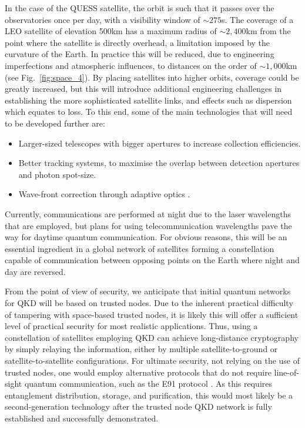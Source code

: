 In the case of the QUESS satellite, the orbit is such that it passes over the observatories once per day, with a visibility window of $\sim 275$s. The coverage of a LEO satellite of elevation 500km has a maximum radius of $\sim 2,400$km from the point where the satellite is directly overhead, a limitation imposed by the curvature of the Earth. In practice this will be reduced, due to engineering imperfections and atmospheric influences, to distances on the order of $\sim 1,000$km (see Fig.~\ref{fig:space_4}). By placing satellites into higher orbits, coverage could be greatly increased, but this will introduce additional engineering challenges in establishing the more sophisticated satellite links, and effects such as dispersion which equates to loss. To this end, some of the main technologies that will need to be developed further are:
\begin{itemize}
\item Larger-sized telescopes with bigger apertures to increase collection efficiencies.
\item Better tracking systems, to maximise the overlap between detection apertures and photon spot-size.
\item Wave-front correction through adaptive optics \cite{bib:liao2017satellite}.
\end{itemize}

Currently, communications are performed at night due to the laser wavelengths that are employed, but plans for using telecommunication wavelengths pave the way for daytime quantum communication. For obvious reasons, this will be an essential ingredient in a global network of satellites forming a constellation capable of communication between opposing points on the Earth where night and day are reversed.

From the point of view of security, we anticipate that initial quantum networks for QKD will be based on trusted nodes. Due to the inherent practical difficulty of tampering with space-based trusted nodes, it is likely this will offer a sufficient level of practical security for most realistic applications. Thus, using a constellation of satellites employing QKD can achieve long-distance cryptography by simply relaying the information, either by multiple satellite-to-ground or satellite-to-satellite configurations. For ultimate security, not relying on the use of trusted nodes, one would employ alternative protocols that do not require line-of-sight quantum communication, such as the E91 protocol \cite{bib:PRL_67_661}. As this requires entanglement distribution, storage, and purification, this would most likely be a second-generation technology after the trusted node QKD network is fully established and successfully demonstrated. 

